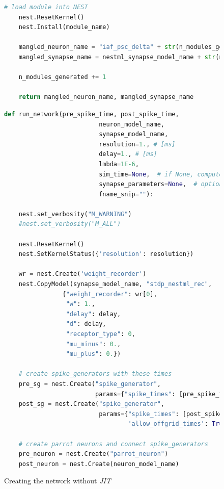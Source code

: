 \begin{figure}[ht!]
\begin{lstlisting}[language=Python]
    # load module into NEST
    nest.ResetKernel()
    nest.Install(module_name)

    mangled_neuron_name = "iaf_psc_delta" + str(n_modules_generated) + "_nestml__with_" + nestml_synapse_model_name + str(n_modules_generated) + "_nestml"
    mangled_synapse_name = nestml_synapse_model_name + str(n_modules_generated) + "_nestml__with_iaf_psc_delta" + str(n_modules_generated) + "_nestml"

    n_modules_generated += 1

    return mangled_neuron_name, mangled_synapse_name
\end{lstlisting}

\label{fig:generating_code}
\end{figure}

\clearpage


\begin{figure}[ht!]
\centering
\caption{Creating the network without \emph{JIT}}
\begin{lstlisting}[language=Python]
def run_network(pre_spike_time, post_spike_time,
                          neuron_model_name,
                          synapse_model_name,
                          resolution=1., # [ms]
                          delay=1., # [ms]
                          lmbda=1E-6,
                          sim_time=None,  # if None, computed from pre and post spike times
                          synapse_parameters=None,  # optional dictionary passed to the synapse
                          fname_snip=""):

    nest.set_verbosity("M_WARNING")
    #nest.set_verbosity("M_ALL")

    nest.ResetKernel()
    nest.SetKernelStatus({'resolution': resolution})

    wr = nest.Create('weight_recorder')
    nest.CopyModel(synapse_model_name, "stdp_nestml_rec",
                {"weight_recorder": wr[0],
                 "w": 1.,
                 "delay": delay,
                 "d": delay,
                 "receptor_type": 0,
                 "mu_minus": 0.,
                 "mu_plus": 0.})

    # create spike_generators with these times
    pre_sg = nest.Create("spike_generator",
                         params={"spike_times": [pre_spike_time, sim_time - 10.]})
    post_sg = nest.Create("spike_generator",
                          params={"spike_times": [post_spike_time],
                                  'allow_offgrid_times': True})

    # create parrot neurons and connect spike_generators
    pre_neuron = nest.Create("parrot_neuron")
    post_neuron = nest.Create(neuron_model_name)


\end{lstlisting}
\end{figure}
